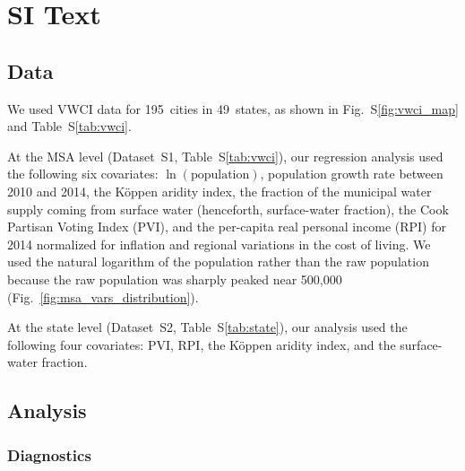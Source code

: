 \documentclass[draft]{agujournal}
\begin{document}
\section*{SI Text}

\subsection*{Data}
We used VWCI data for 195~cities in 49~states, as shown in Fig.~S\ref{fig:vwci_map} and Table~S\ref{tab:vwci}.

At the MSA level (Dataset~S1, Table~S\ref{tab:vwci}), our regression analysis used the following six covariates: $\ln(\text{population})$, population growth rate between 2010 and 2014, the K\"oppen aridity index, the fraction of the municipal water supply coming from surface water (henceforth, surface-water fraction), the Cook Partisan Voting Index (PVI), and the per-capita real personal income (RPI) for 2014 normalized for inflation and regional variations in the cost of living. We used the natural logarithm of the population rather than the raw population because the raw population was sharply peaked near 500,000 (Fig.~\ref{fig:msa_vars_distribution}).

At the state level (Dataset~S2, Table~S\ref{tab:state}), our analysis used the following four covariates: PVI, RPI, the K\"oppen aridity index, and the surface-water fraction.



\subsection*{Analysis}

\subsubsection*{Diagnostics}
\end{document}
